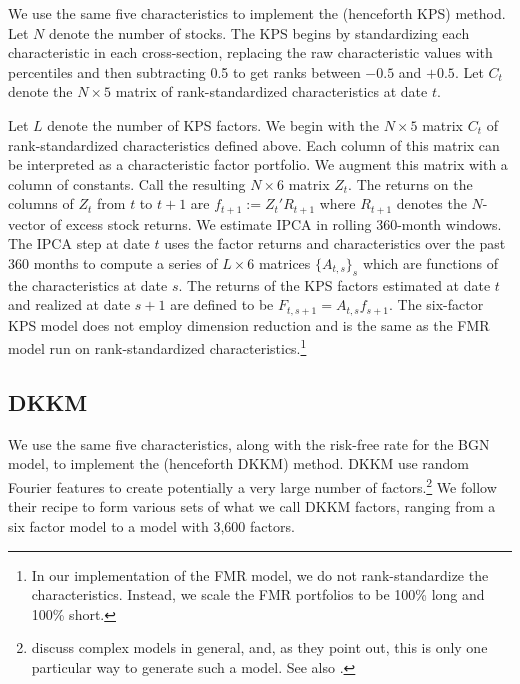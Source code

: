 \documentclass[12pt]{scrarticle}
\begin{document}
We use the same five characteristics to implement the \citet*{kps} (henceforth KPS) method.  Let $N$ denote the number of stocks. The KPS begins by standardizing each characteristic in each cross-section, replacing the raw characteristic values with percentiles and then subtracting 0.5 to get ranks between $-0.5$ and $+0.5$.  Let $C_t$ denote the $N \times 5$ matrix of rank-standardized characteristics at date $t$. 

Let $L$ denote the number of KPS factors.  We begin with the $N \times 5$ matrix $C_t$ of rank-standardized characteristics defined above.  Each column of this matrix can be interpreted as a characteristic factor portfolio.  We augment this matrix with a column of constants.  Call the resulting $N \times 6$ matrix $Z_t$.  The returns on the columns of $Z_t$ from $t$ to $t+1$ are $f_{t+1}:= Z_t'R_{t+1}$ where $R_{t+1}$ denotes the $N$-vector of excess stock returns.  We estimate IPCA in rolling 360-month windows. The IPCA step at date $t$ uses the factor returns and characteristics over the past 360 months to compute a series of $L \times 6$ matrices $\{A_{t, s}\}_s$ which are functions of the characteristics at date $s$. The returns of the KPS factors estimated at date $t$ and realized at date $s+1$ are defined to be $F_{t, s+1} = A_{t, s} f_{s+1}$.  
The six-factor KPS model does not employ dimension reduction and is the same as the FMR model run on rank-standardized characteristics.\footnote{In our implementation of the FMR model, we do not rank-standardize the characteristics.  Instead, we scale the FMR portfolios to be 100\% long and 100\% short.}

\subsection{DKKM}

We use the same five characteristics, along with the risk-free rate for the BGN model, to implement the \citet*{dkkm} (henceforth DKKM) method.  DKKM use random Fourier features to create potentially a very large number of factors.\footnote{\cite{dkkm} discuss complex models in general, and, as they point out, this is only one particular way to generate such a model.  See also \citet{kelly_malamud_2025}.}  We follow their recipe to form various sets of what we call DKKM factors, ranging from a six factor model to a model with 3,600 factors.  
\end{document}
